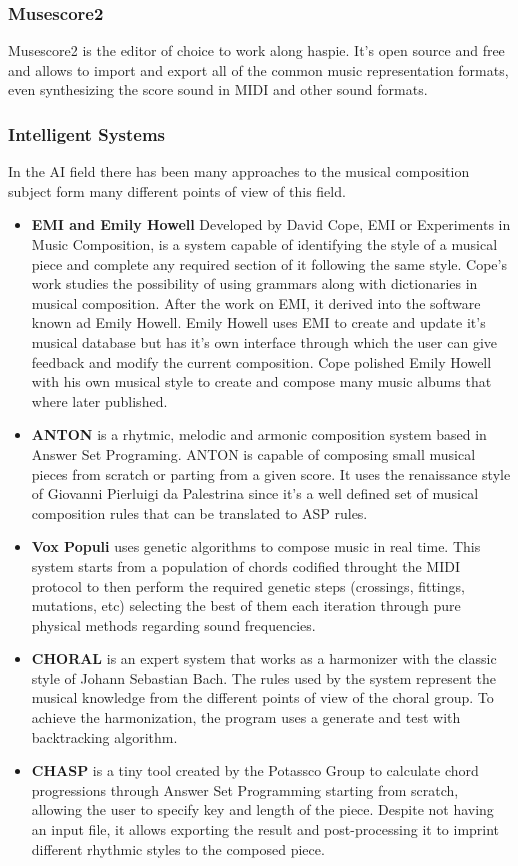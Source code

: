 \subsubsection{Musescore2}
Musescore2 is the editor of choice to work along haspie. It's open source and free and allows to import and export all of the common music representation formats, even synthesizing the score sound in MIDI and other sound formats. 

\subsubsection{Intelligent Systems}
In the AI field there has been many approaches to the musical composition subject form many different points of view of this field.
\begin{itemize}
	\item \textbf{EMI and Emily Howell} Developed by David Cope\cite{experiments-musical-intelligence}, EMI or Experiments in Music Composition, is a system capable of identifying the style of a musical piece and complete any required section of it following the same style. Cope's work studies the possibility of using grammars along with dictionaries in musical composition. After the work on EMI, it derived into the software known ad Emily Howell. Emily Howell uses EMI to create and update it's musical database but has it's own interface through which the user can give feedback and modify the current composition. Cope polished Emily Howell with his own musical style to create and compose many music albums that where later published.
	\item \textbf{ANTON}\cite{anton-composing} is a rhytmic, melodic and armonic composition system based in Answer Set Programing. ANTON is capable of composing small musical pieces from scratch or parting from a given score. It uses the renaissance style of Giovanni Pierluigi da Palestrina since it's a well defined set of musical composition rules that can be translated to ASP rules.
	\item \textbf{Vox Populi}\cite{vox-populi} uses genetic algorithms to compose music in real time. This system starts from a population of chords codified throught the MIDI protocol to then perform the required genetic steps (crossings, fittings, mutations, etc) selecting the best of them each iteration through pure physical methods regarding sound frequencies.
	\item \textbf{CHORAL} is an expert system that works as a harmonizer with the classic style of Johann Sebastian Bach. The rules used by the system represent the musical knowledge from the different points of view of the choral group. To achieve the harmonization, the program uses a generate and test with backtracking algorithm.
	\item \textbf{CHASP} is a tiny tool created by the Potassco Group to calculate chord progressions through Answer Set Programming starting from scratch, allowing the user to specify key and length of the piece. Despite not having an input file, it allows exporting the result and post-processing it to imprint different rhythmic styles to the composed piece.
\end{itemize} 




